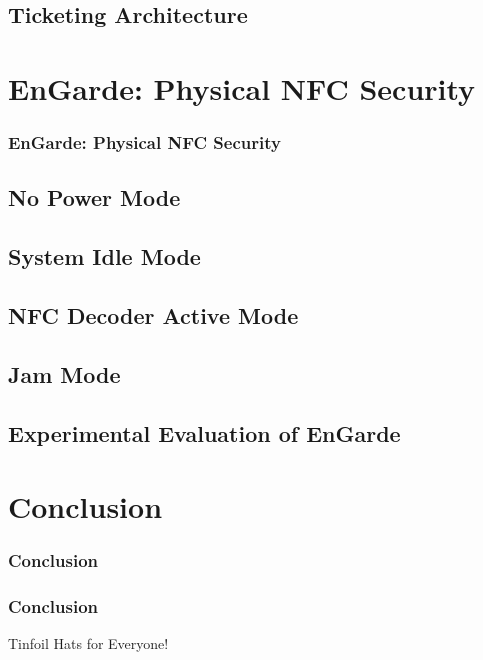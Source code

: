 \documentclass[unknownkeysallowed]{beamer}
\begin{document}
\subsection{Ticketing Architecture}


\section{EnGarde: Physical NFC Security}
\begin{frame}
\frametitle{EnGarde: Physical NFC Security}
\begin{center}\begin{minipage}{.9\textwidth}
\tableofcontents[currentsubsection, hideothersubsections, sectionstyle=show/shaded]
\end{minipage}\end{center}
\end{frame}
%

\subsection{No Power Mode}
\subsection{System Idle Mode}
\subsection{NFC Decoder Active Mode}
\subsection{Jam Mode}
\subsection{Experimental Evaluation of EnGarde}


\section{Conclusion}
\begin{frame}
\frametitle{Conclusion}
\begin{center}\begin{minipage}{.9\textwidth}
\tableofcontents[currentsubsection, hideothersubsections, sectionstyle=show/shaded]
\end{minipage}\end{center}
\end{frame}
%
\begin{frame}
  \frametitle{Conclusion}
  \begin{block}{Tinfoil Hats for Everyone!}
  \end{block}
\end{frame}
\end{document}
